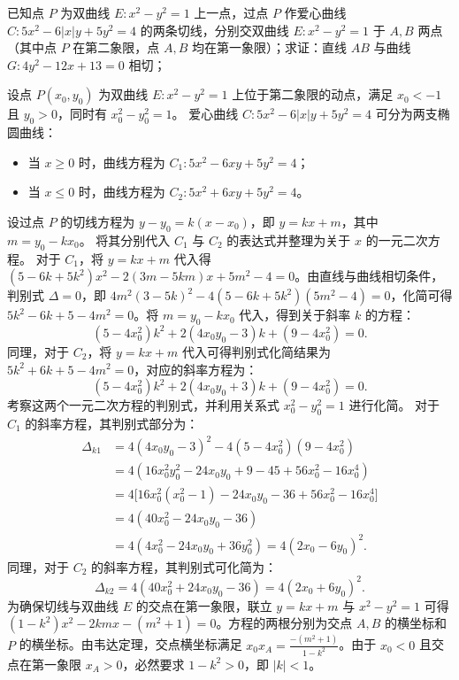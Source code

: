 \begin{example}
已知点 \(P\) 为双曲线 \(E: x^2 - y^2 = 1\) 上一点，过点 \(P\) 作爱心曲线 \(C: 5x^2 - 6|x|y + 5y^2 = 4\) 的两条切线，分别交双曲线 \(E: x^2 - y^2 = 1\) 于 \(A,B\) 两点（其中点 \(P\) 在第二象限，点 \(A,B\) 均在第一象限）；求证：直线 \(AB\) 与曲线 \(G: 4y^2 - 12x + 13 = 0\) 相切；
\end{example}
\begin{solution}
设点 $P(x_0, y_0)$ 为双曲线 $E: x^2 - y^2 = 1$ 上位于第二象限的动点，满足 $x_0 < -1$ 且 $y_0 > 0$，同时有 $x_0^2 - y_0^2 = 1$。
爱心曲线 $C: 5x^2 - 6|x|y + 5y^2 = 4$ 可分为两支椭圆曲线：
\begin{itemize}
\item 当 $x \ge 0$ 时，曲线方程为 $C_1: 5x^2 - 6xy + 5y^2 = 4$；
\item 当 $x \le 0$ 时，曲线方程为 $C_2: 5x^2 + 6xy + 5y^2 = 4$。
\end{itemize}
设过点 $P$ 的切线方程为 $y - y_0 = k(x - x_0)$，即 $y = kx + m$，其中 $m = y_0 - kx_0$。
将其分别代入 $C_1$ 与 $C_2$ 的表达式并整理为关于 $x$ 的一元二次方程。
对于 $C_1$，将 $y = kx + m$ 代入得 $(5 - 6k + 5k^2)x^2 - 2(3m - 5km)x + 5m^2 - 4 = 0$。由直线与曲线相切条件，判别式 $\Delta = 0$，即 $4m^2(3 - 5k)^2 - 4(5 - 6k + 5k^2)(5m^2 - 4) = 0$，化简可得 $5k^2 - 6k + 5 - 4m^2 = 0$。将 $m = y_0 - kx_0$ 代入，得到关于斜率 $k$ 的方程：
\[ (5 - 4x_0^2)k^2 + 2(4x_0y_0 - 3)k + (9 - 4x_0^2) = 0. \]
同理，对于 $C_2$，将 $y = kx + m$ 代入可得判别式化简结果为 $5k^2 + 6k + 5 - 4m^2 = 0$，对应的斜率方程为：
\[ (5 - 4x_0^2)k^2 + 2(4x_0y_0 + 3)k + (9 - 4x_0^2) = 0. \]
考察这两个一元二次方程的判别式，并利用关系式 $x_0^2 - y_0^2 = 1$ 进行化简。
对于 $C_1$ 的斜率方程，其判别式部分为：
\begin{align*}
\Delta_{k1} &= 4(4x_0y_0 - 3)^2 - 4(5 - 4x_0^2)(9 - 4x_0^2) \\
&= 4(16x_0^2y_0^2 - 24x_0y_0 + 9 - 45 + 56x_0^2 - 16x_0^4) \\
&= 4\big[16x_0^2(x_0^2 - 1) - 24x_0y_0 - 36 + 56x_0^2 - 16x_0^4\big] \\
&= 4(40x_0^2 - 24x_0y_0 - 36) \\
&= 4(4x_0^2 - 24x_0y_0 + 36y_0^2) = 4(2x_0 - 6y_0)^2.
\end{align*}
同理，对于 $C_2$ 的斜率方程，其判别式可化简为：
\[ \Delta_{k2} = 4(40x_0^2 + 24x_0y_0 - 36) = 4(2x_0 + 6y_0)^2. \]
为确保切线与双曲线 $E$ 的交点在第一象限，联立 $y = kx + m$ 与 $x^2 - y^2 = 1$ 可得 $(1 - k^2)x^2 - 2kmx - (m^2 + 1) = 0$。方程的两根分别为交点 $A, B$ 的横坐标和 $P$ 的横坐标。由韦达定理，交点横坐标满足 $x_0 x_A = \frac{-(m^2 + 1)}{1 - k^2}$。由于 $x_0 < 0$ 且交点在第一象限 $x_A > 0$，必然要求 $1 - k^2 > 0$，即 $|k| < 1$。

\end{solution}
